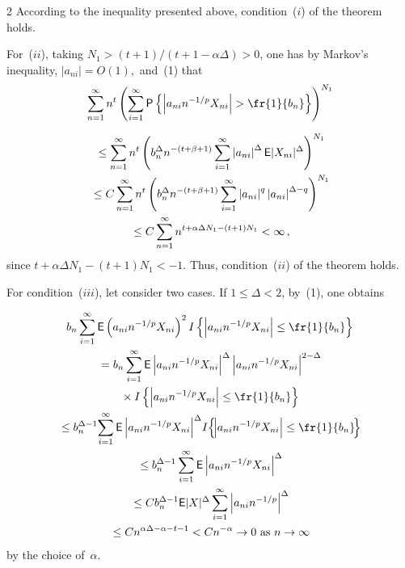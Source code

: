 \begin{multicols}{2}
According to the inequality presented above, condition~($i$) of the theorem holds.

For~($ii$), taking $N_1>(t+1)/(t+1 -\alpha\Delta)>0$, one has by Markov's inequality, 
$|a_{ni}|=O(1),$ and~(1)
that
\begin{multline*}
\sum\limits_{n=1}^\infty n^t \left(
\sum\limits_{i=1}^\infty {\sf P}\left\{\left|a_{ni}n^{-1/p}X_{ni}\right|>\fr{1}{b_n}\right\} \right)^{N_1}
\end{multline*}

\noindent
\begin{multline*}
{}\le \sum\limits_{n=1}^\infty n^t \left( b_n^{\Delta} n^{-(t+\beta+1)} 
\sum\limits_{i=1}^\infty \left|a_{ni}\right|^{\Delta}
{\sf E}|X_{ni}|^{\Delta} \right)^{N_1}\\
{}\le C\sum\limits_{n=1}^\infty n^t \left( b_n^{\Delta} n^{-(t+\beta + 1)} 
\sum\limits_{i=1}^\infty \left|a_{ni}\right|^{q} \left|a_{ni}\right|^{\Delta-q} \right)^{N_1} \\
{}\le C \sum\limits_{n=1}^\infty n^{t + \alpha \Delta N_1 -(t+1)N_1} <\infty\,,
\end{multline*}
since  $t +\alpha \Delta N_1 -(t+1)N_1< -1$. Thus, condition~($ii$) of the theorem holds.

For condition~($iii$), let consider two cases. If $1\le \Delta<2$, by~(1), one obtains

\noindent
\begin{multline*}
b_n \sum\limits_{i=1}^\infty {\sf E}\left(a_{ni}n^{-1/p} X_{ni}\right)^2 
I\left\{\left|a_{ni}n^{-1/p} X_{ni}\right|\le \fr{1}{b_n}\right\}\\
{}=b_n \sum\limits_{i=1}^\infty {\sf E}\left|a_{ni}n^{-1/p} X_{ni}\right|^{\Delta} 
\left|a_{ni}n^{-1/p} X_{ni}\right|^{2-\Delta}\\
{}\times I\left\{\left|a_{ni}n^{-1/p} X_{ni}\right|\le \fr{1}{b_n}\right\}\\
\hspace*{-0.36795pt}{}\le b_n^{\Delta-1}\!\sum\limits_{i=1}^\infty {\sf E}\left|a_{ni}n^{-1/p} X_{ni}\right|^{\Delta} 
\!I\!\left\{\!\left|a_{ni}n^{-1/p}X_{ni}\right|\le \fr{1}{b_n}\!\right\} \\
{}\le b_n^{\Delta-1}\sum\limits_{i=1}^\infty {\sf E}\left|a_{ni}n^{-1/p} X_{ni}\right|^{\Delta} \\
{}\le C b_n^{\Delta-1}{\sf E}|X|^{\Delta} \sum\limits_{i=1}^\infty \left|a_{ni}n^{-1/p}\right|^{\Delta} \\
{}\le C n^{\alpha\Delta -\alpha -t -1} < Cn^{-\alpha} \to 0 \mbox{ as } n\to \infty
\end{multline*}
by the choice of~$\alpha$.


\end{multicols}
